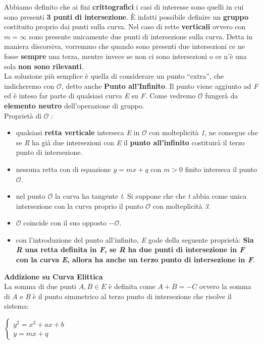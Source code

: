Abbiamo definito che ai fini \textbf{crittografici} i casi di interesse sono quelli in cui sono presenti \textbf{3 punti di intersezione}. È infatti possibile definire un \textbf{gruppo} costituito proprio dai punti sulla curva. Nel caso di rette \textbf{verticali} ovvero con $m = \infty$ sono presente unicamente due punti di intersezione sulla curva. Detta in maniera discorsiva, vorremmo che quando sono presenti due intersezioni ce ne fosse \textbf{sempre} una terza, mentre invece se non ci sono intersezioni o ce n'è una sola \textbf{non sono rilevanti}. \\
La soluzione più semplice è quella di considerare un punto ``extra'', che indicheremo con $\mathcal{O}$, detto anche \textbf{Punto all'Infinito}. Il punto viene aggiunto ad \textit{F} ed è inteso far parte di qualsiasi curva \textit{E} su \textit{F}. Come vedremo $\mathcal{O}$ fungerà da \textbf{elemento neutro} dell'operazione di gruppo. \\
Proprietà di $\mathcal{O}$ :
\begin{itemize}
    \item qualsiasi \textbf{retta verticale} interseca \textit{E} in $\mathcal{O}$ con molteplicità \textit{1}, ne consegue che se \textit{R} ha già due intersezioni con \textit{E} il \textbf{punto all'infinito} costituirà il terzo punto di intersezione.
    \item nessuna retta con di equazione $y = mx + q$ con $m > 0$ finito interseca il punto $\mathcal{O}$.
    \item nel punto $\mathcal{O}$ la curva ha tangente \textit{t}. Si suppone che che \textit{t} abbia come unica intersezione con la curva proprio il punto $\mathcal{O}$ con molteplicità \textit{3}.
    \item $\mathcal{O}$ coincide con il suo opposto $-\mathcal{O}$.
    \item con l'introduzione del punto all'infinito, \textit{E} gode della seguente proprietà: \textbf{Sia \textit{R} una retta definita in \textit{F}, se \textit{R} ha due punti di intersezione in \textit{F} con la curva \textit{E}, allora ha anche un terzo punto di intersezione in \textit{F}}.
\end{itemize}

\newpage
\textbf{Addizione su Curva Elittica} \\
La somma di due punti $A, B \in E$ è definita come $A + B = -C$ ovvero la somma di \textit{A} e \textit{B} è il punto simmetrico al terzo punto di intersezione che risolve il sistema:
\begin{center}
    \begin{math}
        \begin{cases}
            y^2 = x^3 + ax + b \\
            y = mx + q
        \end{cases}
    \end{math}
\end{center}

